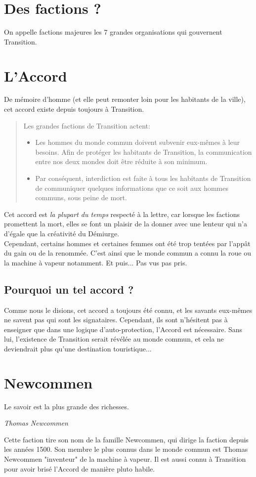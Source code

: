 \documentclass{book}
\begin{document}
\section{Des factions ?}
On appelle factions majeures les 7 grandes organisations qui gouvernent Transition.
\hypertarget{accord}{\section{L'Accord}}
De mémoire d'homme (et elle peut remonter loin pour les habitants de la ville), cet accord existe depuis toujours à Transition.
\begin{quote}
	Les grandes factions de Transition actent:
	\begin{itemize}
		\item Les hommes du monde commun doivent subvenir eux-mêmes à leur besoins. Afin de protéger les habitants de Transition, la communication entre nos deux mondes doit être réduite à son minimum.
		\item Par conséquent, interdiction est faite à tous les habitants de Transition de communiquer quelques informations que ce soit aux hommes communs, sous peine de mort.
	\end{itemize}
\end{quote}
Cet accord est \emph{la plupart du temps} respecté à la lettre, car lorsque les factions promettent la mort, elles se font un plaisir de la donner avec une lenteur qui n'a d'égale que la créativité du Démiurge.
\\
Cependant, certains hommes et certaines femmes ont été trop tentées par l'appât du gain ou de la renommée. C'est ainsi que le monde commun a connu la roue ou la machine à vapeur notamment. Et puis... Pas vus pas pris.
\\
\subsection{Pourquoi un tel accord ?}
Comme nous le disions, cet accord a toujours été connu, et les savants eux-mêmes ne savent pas qui sont les signataires. Cependant, ils sont n'hésitent pas à enseigner que dans une logique d'auto-protection, l'Accord est nécessaire. Sans lui, l'existence de Transition serait révélée au monde commun, et cela ne deviendrait plus qu'une destination touristique...
\section{Newcommen}
\epigraph{Le savoir est la plus grande des richesses.}{\textit{Thomas Newcommen}}
Cette faction tire son nom de la famille Newcommen, qui dirige la faction depuis les années 1500. Son membre le plus connus dans le monde commun est Thomas Newcommen "inventeur" de la machine à vapeur. Il est aussi connu à Transition pour avoir brisé l'Accord de manière pluto habile.
\end{document}

